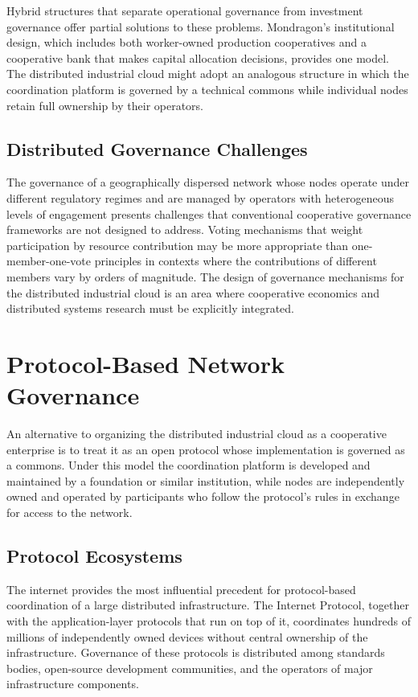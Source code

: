 \documentclass[12pt]{book}
\theoremstyle{definition}
\theoremstyle{remark}
\begin{document}
Hybrid structures that separate operational governance from
investment governance offer partial solutions to these problems.
Mondragon's institutional design, which includes both worker-owned
production cooperatives and a cooperative bank that makes capital
allocation decisions, provides one model. The distributed industrial
cloud might adopt an analogous structure in which the coordination
platform is governed by a technical commons while individual nodes
retain full ownership by their operators.

\section{Distributed Governance Challenges}

The governance of a geographically dispersed network whose nodes
operate under different regulatory regimes and are managed by
operators with heterogeneous levels of engagement presents challenges
that conventional cooperative governance frameworks are not designed
to address. Voting mechanisms that weight participation by resource
contribution may be more appropriate than one-member-one-vote
principles in contexts where the contributions of different members
vary by orders of magnitude. The design of governance mechanisms
for the distributed industrial cloud is an area where cooperative
economics and distributed systems research must be explicitly
integrated.

\chapter{Protocol-Based Network Governance}

An alternative to organizing the distributed industrial cloud as a
cooperative enterprise is to treat it as an open protocol whose
implementation is governed as a commons. Under this model the
coordination platform is developed and maintained by a foundation or
similar institution, while nodes are independently owned and operated
by participants who follow the protocol's rules in exchange for access
to the network.

\section{Protocol Ecosystems}

The internet provides the most influential precedent for protocol-based
coordination of a large distributed infrastructure. The Internet
Protocol, together with the application-layer protocols that run on
top of it, coordinates hundreds of millions of independently owned
devices without central ownership of the infrastructure. Governance
of these protocols is distributed among standards bodies, open-source
development communities, and the operators of major infrastructure
components.
\end{document}
